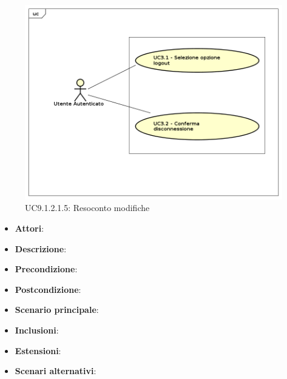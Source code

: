 					\label{UC9.1.2.1.5}
					\begin{figure}[h]
						\centering
					\includegraphics[scale=0.7,keepaspectratio]{UML/UC9.png}
						\caption{UC9.1.2.1.5: Resoconto modifiche}
					\end{figure}
					\FloatBarrier
					\begin{itemize}
						\item \textbf{Attori}: 
						\item \textbf{Descrizione}: 
						\item \textbf{Precondizione}: 
						\item \textbf{Postcondizione}: 
						\item \textbf{Scenario principale}:
						\item \textbf{Inclusioni}:
						\item \textbf{Estensioni}:
						\item \textbf{Scenari alternativi}:
					\end{itemize}
					
